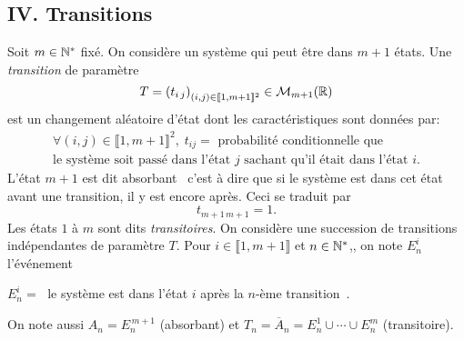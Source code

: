 \subsection*{IV. Transitions}
Soit $m\in \mathbb{N}^*$ fixé. On considère un système qui peut être dans $m+1$ états.\newline
Une \emph{transition} de paramètre 
\[
T = \left( t_{i\, j}\right)_{(i,j)\in \llbracket 1, m+1\rrbracket^2} \in \mathcal{M}_{m+1}(\mathbb{R})  
\]
est un changement aléatoire d'état dont les caractéristiques sont données par: 
\begin{multline*}
  \forall (i,j)\in \llbracket 1, m+1\rrbracket^2,\; t_{ij} = \text{ probabilité conditionnelle que } \\
  \text{le système soit passé dans l'état $j$ sachant qu'il était dans l'état $i$}.
\end{multline*}
L'état $m+1$ est dit \og absorbant\fg~ c'est à dire que si le système est dans cet état avant une transition, il y est encore après. Ceci se traduit par
\[
  t_{m+1\, m+1} = 1.
\]
Les états $1$ à $m$ sont dits \emph{transitoires}.\newline
On considère une succession de transitions indépendantes de paramètre $T$.\newline
Pour $i \in \llbracket 1,m+1 \rrbracket$ et $n\in \mathbb{N}^*$,, on note $E_n^i$ l'événement 
\begin{center}
  $E_n^i = \;$ \og le système est dans l'état $i$ après la $n$-ème transition\fg~.
\end{center}
On note aussi $A_n = E_n^{\,m+1}$ (absorbant) et $T_n = \overline{A}_n = E_n^1 \cup \cdots \cup E_n^m$ (transitoire).
